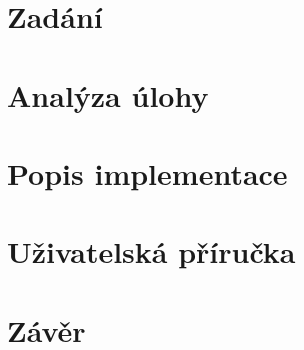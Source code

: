 \documentclass[a4paper, 12pt]{article}
\begin{document}
\begin{titlepage}
    
\end{titlepage}

\setcounter{page}{1}
\tableofcontents
\newpage

\section{Zadání}


\section{Analýza úlohy}

\newpage
\section{Popis implementace}


\section{Uživatelská příručka}

\newpage
\section{Závěr}



\end{document}
